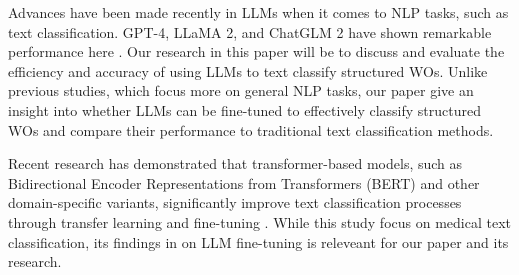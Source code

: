 \documentclass{article}
\begin{document}
Advances have been made recently in LLMs when it comes to NLP tasks, such as text classification.
GPT-4, LLaMA 2, and ChatGLM 2 have shown remarkable performance here \cite{zhang2024}.
Our research in this paper will be to discuss and evaluate the efficiency and accuracy of using LLMs
to text classify structured WOs. Unlike previous studies, which focus more on general NLP tasks,
our paper give an insight into whether LLMs can be fine-tuned to effectively classify structured WOs and
compare their performance to traditional text classification methods.

Recent research has demonstrated that transformer-based models, such as
Bidirectional Encoder Representations from Transformers (BERT) and other domain-specific variants,
significantly improve text classification processes through transfer learning and fine-tuning \cite{Nazyrova2024}.
While this study focus on medical text classification, its findings in on LLM fine-tuning is releveant for our
paper and its research.





\end{document}
